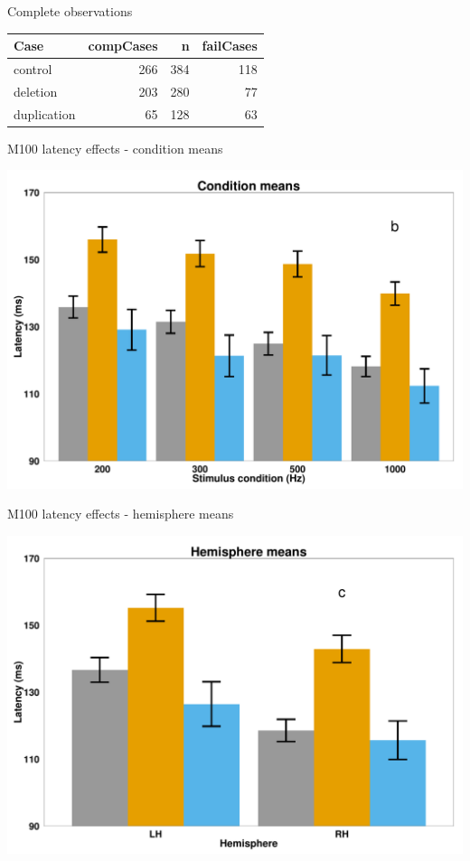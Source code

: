 \begin{frame}{Complete observations}

\begin{longtable}[c]{@{}lrrr@{}}
\toprule
Case & compCases & n & failCases\tabularnewline
\midrule
\endhead
control & 266 & 384 & 118\tabularnewline
deletion & 203 & 280 & 77\tabularnewline
duplication & 65 & 128 & 63\tabularnewline
\bottomrule
\end{longtable}

\end{frame}

\begin{frame}{M100 latency effects - condition means}

\includegraphics{m100-beamer-presentation-version_files/figure-beamer/condition means-1.pdf}

\end{frame}

\begin{frame}{M100 latency effects - hemisphere means}

\includegraphics{m100-beamer-presentation-version_files/figure-beamer/hemisphere means-1.pdf}

\end{frame}

